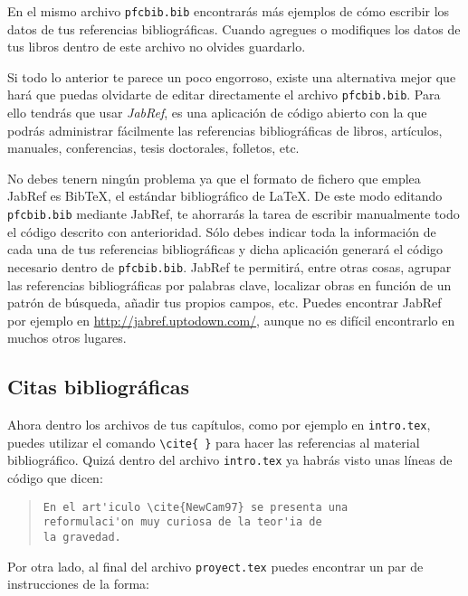 En el mismo archivo \texttt{pfcbib.bib} encontrar\'as m\'as ejemplos de c\'omo escribir los
datos de tus referencias bibliogr\'aficas. Cuando agregues o modifiques los datos de tus
libros dentro de este archivo no olvides guardarlo.

Si  todo lo anterior te parece un poco engorroso, existe una alternativa mejor que har\'a que puedas 
olvidarte de editar directamente el archivo \texttt{pfcbib.bib}. Para ello tendr\'as que usar \emph{JabRef}, 
es una aplicaci\'on de c\'odigo abierto con la que podr\'as administrar f\'acilmente las referencias bibliogr\'aficas de libros, art\'iculos, manuales, conferencias, tesis doctorales, folletos, etc.
 
No debes tenern ning\'un problema ya que el formato de fichero que emplea 
JabRef es BibTeX, el est\'andar bibliogr\'afico de \LaTeX{}. De este modo editando \texttt{pfcbib.bib} mediante JabRef,
te ahorrar\'as la tarea de escribir manualmente todo el c\'odigo descrito con anterioridad. S\'olo debes indicar toda la informaci\'on de cada una de tus referencias bibliogr\'aficas y dicha aplicaci\'on generar\'a el c\'odigo necesario dentro
de \texttt{pfcbib.bib}. JabRef te permitir\'a, entre otras cosas, agrupar las referencias bibliogr\'aficas por palabras clave, localizar obras en funci\'on de un patr\'on de b\'usqueda, a\~nadir tus propios campos, etc. Puedes encontrar JabRef por ejemplo en \url{http://jabref.uptodown.com/}, aunque no es dif\'icil encontrarlo en muchos otros lugares.


\subsection{Citas bibliogr\'aficas}

Ahora dentro los archivos de tus cap\'itulos, como por ejemplo en \texttt{intro.tex},
puedes utilizar el comando \verb|\cite{ }| para hacer las referencias al material
bibliogr\'afico. Quiz\'a dentro del archivo \texttt{intro.tex} ya habr\'as visto unas
l\'ineas de c\'odigo que dicen:

\begin{quote}
\begin{verbatim}
En el art'iculo \cite{NewCam97} se presenta una
reformulaci'on muy curiosa de la teor'ia de
la gravedad.
\end{verbatim}
\end{quote}

Por otra lado, al final del archivo \texttt{proyect.tex} puedes encontrar un par de
instrucciones de la forma:

